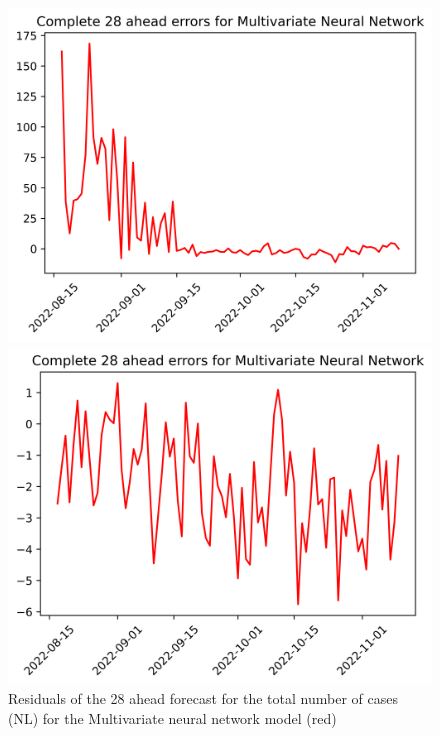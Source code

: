 \begin{figure}

\begin{minipage}{.32\textwidth}
  \centering
  \includegraphics[width=\linewidth]{pics/28_ah/28_ahead_errors_Multivariate Neural Network.png}
  \caption{Residuals of the 28 ahead forecast for the total number of cases (NL) for the Multivariate neural network model (red)}
  \label{fig:tot_cases_error_28_mvnn}
\end{minipage}
\begin{minipage}{.32\textwidth}
  \centering
  \includegraphics[width=\linewidth]{pics/28_ah/DE_28_ahead_errors_Multivariate Neural Network.png}

\end{minipage}
\end{figure}

